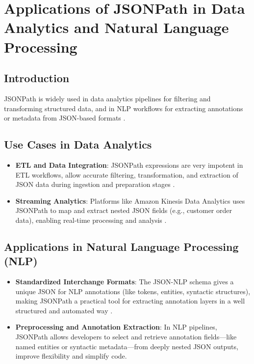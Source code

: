 \chapter{Applications of JSONPath in Data Analytics and Natural Language Processing}
\label{chap:applications-jsonpath}

\section{Introduction}

JSONPath is widely used in data analytics pipelines for filtering and transforming structured data, and in NLP workflows for extracting annotations or metadata from JSON-based formats \cite{jsonpath_data_analytics, restfulapi_jsonpath}.

\section{Use Cases in Data Analytics}

\begin{itemize}
	\item \textbf{ETL and Data Integration}: JSONPath expressions are very impotent in ETL workflows, allow accurate filtering, transformation, and extraction of JSON data during ingestion and preparation stages \cite{jsonpath_data_analytics}.
	\item \textbf{Streaming Analytics}: Platforms like Amazon Kinesis Data Analytics uses JSONPath to map and extract nested JSON fields (e.g., customer order data), enabling real-time processing and analysis \cite{kinesis_jsonpath}.
\end{itemize}

\section{Applications in Natural Language Processing (NLP)}

\begin{itemize}
	\item \textbf{Standardized Interchange Formats}: The JSON-NLP schema gives a unique JSON for NLP annotations (like tokens, entities, syntactic structures), making JSONPath a practical tool for extracting annotation layers in a well structured and automated way \cite{json_nlp_schema}.
	\item \textbf{Preprocessing and Annotation Extraction}: In NLP pipelines, JSONPath allows developers to select and retrieve annotation fields—like named entities or syntactic metadata—from deeply nested JSON outputs, improve flexibility and simplify code.
\end{itemize}

